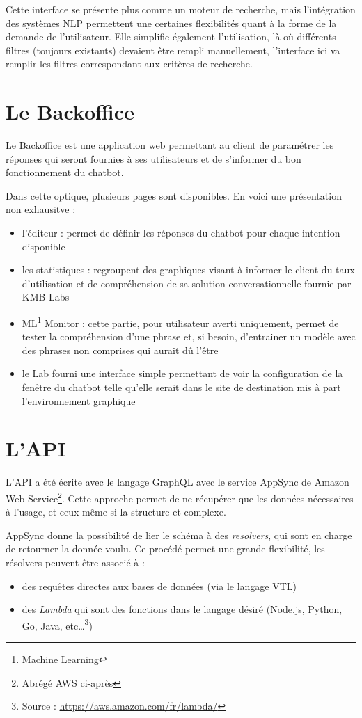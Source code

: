 \documentclass[12pt,a4paper,oneside]{scrreprt}
\begin{document}
Cette interface se présente plus comme un moteur de recherche, mais l'intégration des systèmes NLP permettent une certaines flexibilités quant à la forme de la demande de l'utilisateur. Elle simplifie également l'utilisation, là où différents filtres (toujours existants) devaient être rempli manuellement, l'interface ici va remplir les filtres correspondant aux critères de recherche.

\section{Le Backoffice}

Le Backoffice est une application web permettant au client de paramétrer les réponses qui seront fournies à ses utilisateurs et de s'informer du bon fonctionnement du chatbot.

Dans cette optique, plusieurs pages sont disponibles. En voici une présentation non exhausitve :
\begin{itemize}
\item l'éditeur : permet de définir les réponses du chatbot pour chaque intention disponible
\item les statistiques : regroupent des graphiques visant à informer le client du taux d'utilisation et de compréhension de sa solution conversationnelle fournie par KMB Labs
\item ML\footnote{Machine Learning} Monitor : cette partie, pour utilisateur averti uniquement, permet de tester la compréhension d'une phrase et, si besoin, d'entrainer un modèle avec des phrases non comprises qui aurait dû l'être
\item le Lab fourni une interface simple permettant de voir la configuration de la fenêtre du chatbot telle qu'elle serait dans le site de destination mis à part l'environnement graphique
\end{itemize}

\section{L'API}

L'API a été écrite avec le langage GraphQL avec le service AppSync de Amazon Web Service\footnote{Abrégé \og AWS\fg{} ci-après}. Cette approche permet de ne récupérer que les données nécessaires  à l'usage, et ceux même si la structure et complexe.

AppSync donne la possibilité de lier le schéma à des \textit{resolvers}, qui sont en charge de retourner la donnée voulu. Ce procédé permet une grande flexibilité, les résolvers peuvent être associé à :
\begin{itemize}
	\item des requêtes directes aux bases de données (via le langage VTL)
	\item des \textit{Lambda} qui sont des fonctions dans le langage désiré (Node.js, Python, Go, Java, etc\dots\footnote{Source : \url{https://aws.amazon.com/fr/lambda/}})
\end{itemize}
\end{document}

